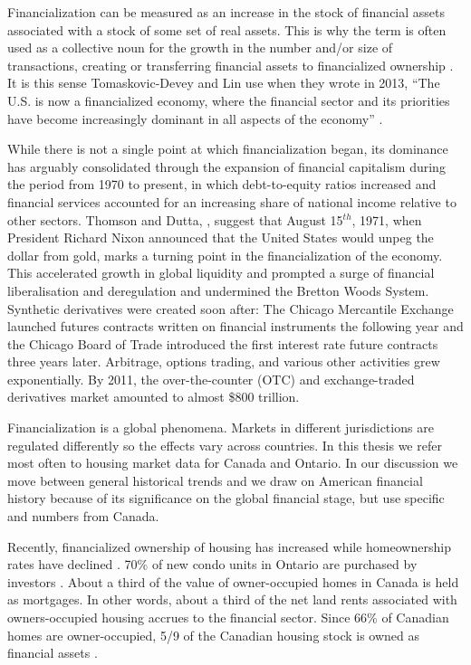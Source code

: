 Financialization can be measured as an increase in the stock of financial assets associated with a stock of some set of real assets. This is why the term is often used as a collective noun for the growth in the number and/or size of  transactions, creating or transferring financial assets to financialized ownership \cite{GET_financialization-numberOfTransactions}. %
It is this sense  Tomaskovic-Devey and Lin use when they wrote in 2013, ``The U.S. is now a financialized economy, where the financial sector and its priorities have become increasingly dominant in all aspects of the economy'' \cite{tomaskovic-deveyFinancializationCausesInequality2013}. 

While there is not a single point at which financialization began, its dominance has arguably consolidated through the expansion of financial capitalism during the period from 1970 to present, in which debt-to-equity ratios increased and financial services accounted for an increasing share of national income relative to other sectors. Thomson and Dutta, \cite{thomsonFinancialisationPrimer2018}, suggest that August 15$^{th}$, 1971, when President Richard Nixon announced that the United States would unpeg the dollar from gold, marks a turning point in the financialization of the economy. This accelerated growth in global liquidity and prompted a surge of financial liberalisation and deregulation and undermined the Bretton Woods System. Synthetic derivatives were created soon after: The Chicago Mercantile Exchange launched futures contracts written on financial instruments the following year and the Chicago Board of Trade introduced the first interest rate future contracts three years later. Arbitrage, options trading, and various other activities grew exponentially. By 2011, the over-the-counter (OTC) and exchange-traded derivatives market amounted to almost \$800 trillion.

Financialization is a global phenomena. Markets in different jurisdictions are regulated differently so the effects vary across countries. In this thesis we refer most often to housing market data for Canada and Ontario. In our discussion we move between general historical trends and we draw on American financial history because of its significance on the global financial stage, but use specific and numbers from Canada. 

Recently, financialized ownership of housing has increased while homeownership rates have declined \cite{statisticscanadaBuyRentHousing2022}.
70\% of new condo units in Ontario are purchased by investors \cite{GET_ontario_condo_ownership}.  About a third of the value of  owner-occupied homes in Canada is held as mortgages. In other words, about a third of the net land rents associated with owners-occupied housing accrues to the financial sector. Since 66\% of Canadian homes are owner-occupied,  5/9 of the Canadian housing stock is owned as financial assets \cite{nemtinFinancializationHousingSocial2021}. %


